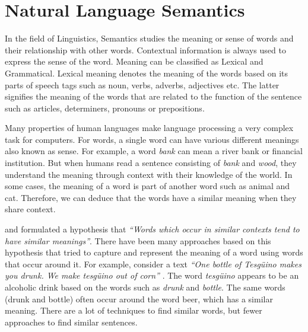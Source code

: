 \documentclass[12pt]{report} %
\begin{document}
	\section{Natural Language Semantics}
	\label{nlp_sem} 
	
	In the field of Linguistics, Semantics studies the meaning or sense of words and their relationship with other words. Contextual information is always used to express the sense of the word. Meaning can be classified as Lexical and Grammatical. Lexical meaning denotes the meaning of the words based on its parts of speech tags such as noun, verbs, adverbs, adjectives etc. The latter signifies the meaning of the words that are related to the function of the sentence such as articles, determiners, pronouns or prepositions.
	
	
	Many properties of human languages make language processing a very complex task for computers. For words, a single word can have various different meanings also known as sense. For example, a word \textit{bank} can mean a river bank or financial institution. But when humans read a sentence consisting of \textit{bank} and\textit{ wood}, they understand the meaning through context with their knowledge of the world. In some cases, the meaning of a word is part of another word such as animal and cat. Therefore, we can deduce that the words have a similar meaning when they share context.
	
	\cite{harris1970distributional} and \cite{firth1957synopsis} formulated a hypothesis that \textit{ \textquotedblleft Words which occur in similar contexts tend to have similar meanings\textquotedblright}. There have been many approaches based on this hypothesis that tried to capture and represent the meaning of a word using words that occur around it. For example, consider a text \textit{ \textquotedblleft One bottle of Tesgüino makes you drunk. We make tesgüino out of corn\textquotedblright} \citep{jurafsky2014speech}.  The word \textit{tesgüino}  appears to be an alcoholic drink based on the words such as \textit{drunk} and \textit{bottle}. The same words (drunk and bottle) often occur around the word beer, which has a similar meaning. There are a lot of techniques to find similar words, but fewer approaches to find similar sentences.
	
	
\end{document}
